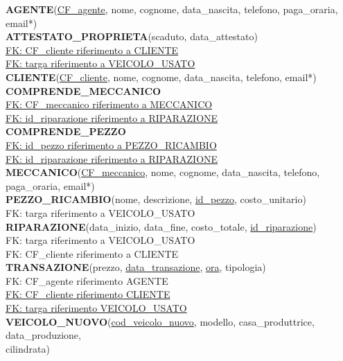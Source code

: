 \documentclass[a4paper,12pt]{report}
\begin{document}
\textbf{AGENTE}(\underline{CF\_agente}, nome, cognome, data\_nascita, telefono, paga\_oraria, email*)\\

\noindent
\textbf{ATTESTATO\_PROPRIETA}(scaduto, data\_attestato)\\
\underline{FK: CF\_cliente riferimento a CLIENTE}\\
\underline{FK: targa riferimento a VEICOLO\_USATO}\\

\noindent
\textbf{CLIENTE}(\underline{CF\_cliente}, nome, cognome, data\_nascita, telefono, email*)\\

\noindent
\textbf{COMPRENDE\_MECCANICO}\\
\underline{FK: CF\_meccanico riferimento a MECCANICO}\\
\underline{FK: id\_riparazione riferimento a RIPARAZIONE}\\

\noindent
\textbf{COMPRENDE\_PEZZO}\\
\underline{FK: id\_pezzo riferimento a PEZZO\_RICAMBIO}\\
\underline{FK: id\_riparazione riferimento a RIPARAZIONE}\\

\noindent
\textbf{MECCANICO}(\underline{CF\_meccanico}, nome, cognome, data\_nascita, telefono, paga\_oraria, email*)\\

\noindent
\textbf{PEZZO\_RICAMBIO}(nome, descrizione, \underline{id\_pezzo}, costo\_unitario)\\
FK: targa riferimento a VEICOLO\_USATO\\

\noindent
\textbf{RIPARAZIONE}(data\_inizio, data\_fine, costo\_totale, \underline{id\_riparazione})\\
FK: targa riferimento a VEICOLO\_USATO\\
FK: CF\_cliente riferimento a CLIENTE\\

\noindent
\textbf{TRANSAZIONE}(prezzo, \underline{data\_transazione}, \underline{ora}, tipologia)\\
FK: CF\_agente riferimento AGENTE\\
\underline{FK: CF\_cliente riferimento CLIENTE}\\
\underline{FK: targa riferimento VEICOLO\_USATO}\\

\noindent
\textbf{VEICOLO\_NUOVO}(\underline{cod\_veicolo\_nuovo}, modello, casa\_produttrice, data\_produzione,\\
cilindrata)\\
\end{document}
